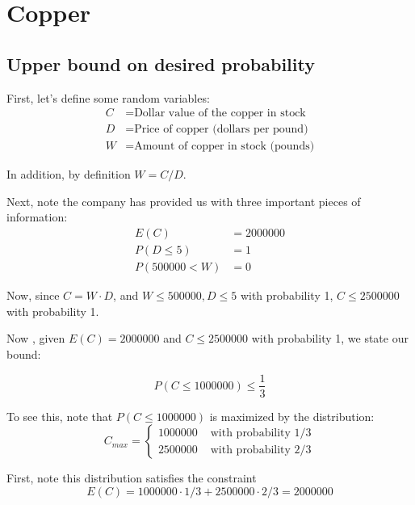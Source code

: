 \documentclass[paper=a4, fontsize=11pt]{scrartcl} %
\numberwithin{equation}{section} %
\numberwithin{figure}{section} %
\numberwithin{table}{section} %
\begin{document}

\section{Copper}

\subsection{Upper bound on desired probability}

First, let's define some random variables:
\begin{align*}
C &= \textrm{Dollar value of the copper in stock}\\
D &= \textrm{Price of copper (dollars per pound)}\\
W &= \textrm{Amount of copper in stock (pounds)}
\end{align*}

In addition, by definition  $W = C/D$.

Next, note the company has provided us with three important pieces of information:
\begin{align*}
E(C) &= 2000000\\
P(D \leq 5) &= 1\\
P(500000 < W) &= 0
\end{align*}

Now, since $C = W \cdot D$, and $W \leq 500000, D \leq 5$ with probability 1, $C \leq 2500000$ with probability 1.

Now , given $E(C) = 2000000$ and $C \leq 2500000$ with probability 1, we state our bound: 

\begin{equation*}
P(C \leq 1000000) \leq \frac{1}{3}
\end{equation*}

To see this, note that $P(C \leq 1000000)$ is maximized by the distribution:
\[
C_{max} =  
\begin{cases}
   1000000 & \textrm{ with probability } 1/3 \\
   2500000 & \textrm{ with probability } 2/3
\end{cases}
\]

First, note this distribution satisfies the constraint
\begin{equation*}
E(C) = 1000000 \cdot 1/3 + 2500000 \cdot 2/3 = 2000000
\end{equation*}
\end{document}
